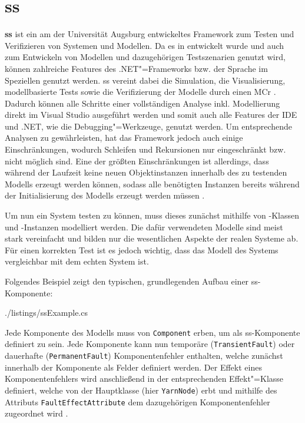 \section{\acl{ss}}
\label{sec:sSharp}

\textbf{\acf{ss}} ist ein am \isse der Universität Augsburg entwickeltes Framework zum Testen und Verifizieren von Systemen und Modellen.
Da es in \cS entwickelt wurde und \cS auch zum Entwickeln von Modellen und dazugehörigen Testszenarien genutzt wird, können zahlreiche Features des .NET"=Frameworks bzw. der Sprache \cS im Speziellen genutzt werden.
\ac{ss} vereint dabei die Simulation, die Visualisierung, modellbasierte Tests sowie die Verifizierung der Modelle durch einen \ac{MCr} \cite{Habermaier2015,Habermaier2016}.
Dadurch können alle Schritte einer vollständigen Analyse inkl. Modellierung direkt im Visual Studio ausgeführt werden und somit auch alle Features der IDE und .NET, wie \zB die Debugging"=Werkzeuge, genutzt werden.
Um entsprechende Analysen zu gewährleisten, hat das Framework jedoch auch einige Einschränkungen, wodurch \zB Schleifen und Rekursionen nur eingeschränkt bzw. nicht möglich sind.
Eine der größten Einschränkungen ist allerdings, dass während der Laufzeit keine neuen Objektinstanzen innerhalb des zu testenden Modells erzeugt werden können, sodass alle benötigten Instanzen bereits während der Initialisierung des Modells erzeugt werden müssen \cite{Habermaier2015}.

Um nun ein System testen zu können, muss dieses zunächst mithilfe von \cS-Klassen und -Instanzen modelliert werden.
Die dafür verwendeten Modelle sind meist stark vereinfacht und bilden nur die wesentlichen Aspekte der realen Systeme ab.
Für einen korrekten Test ist es jedoch wichtig, dass das Modell des Systems vergleichbar mit dem echten System ist.

Folgendes Beispiel zeigt den typischen, grundlegenden Aufbau einer \ac{ss}-Komponente:


{./listings/ssExample.cs}

Jede Komponente des Modells muss von \texttt{Component} erben, um als \ac{ss}-Komponente definiert zu sein.
Jede Komponente kann nun temporäre (\texttt{TransientFault}) oder dauerhafte (\texttt{PermanentFault}) Komponentenfehler enthalten, welche zunächst innerhalb der Komponente als Felder definiert werden. 
Der Effekt eines Komponentenfehlers wird anschließend in der entsprechenden Effekt"=Klasse definiert, welche von der Hauptklasse (hier \texttt{YarnNode}) erbt und mithilfe des Attributs \texttt{FaultEffectAttribute} dem dazugehörigen Komponentenfehler zugeordnet wird \cite{Habermaier2016}.

